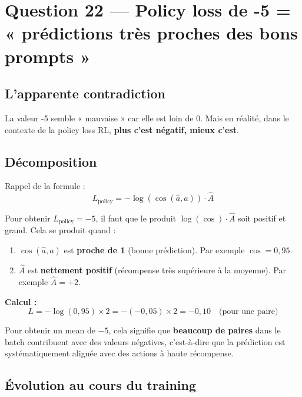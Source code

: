 \documentclass[11pt,a4paper]{article}
\begin{document}
\section{Question 22 — Policy loss de -5 = « prédictions très proches des bons prompts »}

\subsection{L'apparente contradiction}

La valeur -5 semble « mauvaise » car elle est loin de 0. Mais en réalité, dans le contexte de la policy loss RL, \textbf{plus c'est négatif, mieux c'est}.

\subsection{Décomposition}

Rappel de la formule :
\begin{equation}
L_{\text{policy}} = -\log(\cos(\hat{a}, a)) \cdot \hat{A}
\end{equation}

Pour obtenir $L_{\text{policy}} = -5$, il faut que le produit $\log(\cos) \cdot \hat{A}$ soit positif et grand. Cela se produit quand :

\begin{enumerate}
    \item $\cos(\hat{a}, a)$ est \textbf{proche de 1} (bonne prédiction). Par exemple $\cos = 0{,}95$.
    \item $\hat{A}$ est \textbf{nettement positif} (récompense très supérieure à la moyenne). Par exemple $\hat{A} = +2$.
\end{enumerate}

\textbf{Calcul :}
\begin{equation}
L = -\log(0{,}95) \times 2 = -(-0{,}05) \times 2 = -0{,}10 \quad \text{(pour une paire)}
\end{equation}

Pour obtenir un mean de $-5$, cela signifie que \textbf{beaucoup de paires} dans le batch contribuent avec des valeurs négatives, c'est-à-dire que la prédiction est systématiquement alignée avec des actions à haute récompense.

\subsection{Évolution au cours du training}
\end{document}
